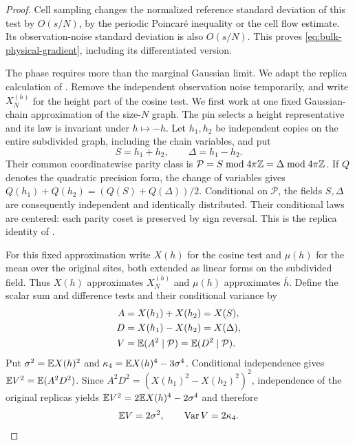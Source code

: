 \begin{proof}
Cell sampling changes the normalized reference standard deviation
of this test by $O(s/N)$, by the periodic Poincar\'e inequality
or the cell flow estimate.  Its observation-noise standard
deviation is also $O(s/N)$.  This proves
\eqref{eq:bulk-physical-gradient}, including its differentiated
version.

The phase requires more than the marginal Gaussian limit.  We
adapt the replica calculation of
\cite[Lemma 10.1]{B}.  Remove the
independent observation noise temporarily, and write $X_N^{(h)}$
for the height part of the cosine test.  We first work at one
fixed Gaussian-chain approximation of the size-$N$ graph.  The
pin selects a height representative and its law is invariant
under $h\mapsto-h$.  Let $h_1,h_2$ be independent copies on
the entire subdivided graph, including the chain variables, and put
\[
 S=h_1+h_2,\qquad \Delta=h_1-h_2.
\]
Their common coordinatewise parity class is
$\mathcal P=S\bmod4\pi\mathbb Z=\Delta\bmod4\pi\mathbb Z$.  If $Q$ denotes
the quadratic precision form, the change of variables gives
$Q(h_1)+Q(h_2)=(Q(S)+Q(\Delta))/2$.  Conditional on
$\mathcal P$, the fields $S,\Delta$ are consequently independent
and identically distributed.  Their conditional laws are centered:
each parity coset is preserved by sign reversal.  This is the
replica identity of \cite[Equation (2.12), in the
proof of Theorem 2.5]{X}.

For this fixed approximation write $X(h)$ for the cosine test and
$\mu(h)$ for the mean over the original sites, both extended as
linear forms on the subdivided field.  Thus $X(h)$ approximates
$X_N^{(h)}$ and $\mu(h)$ approximates $\bar h$.  Define the scalar
sum and difference tests and their conditional variance by
\begin{align*}
 A&=X(h_1)+X(h_2)=X(S),\\
 D&=X(h_1)-X(h_2)=X(\Delta),\\
 V&=\mathbb E(A^2\mid\mathcal P)=\mathbb E(D^2\mid\mathcal P).
\end{align*}
Put $\sigma^2=\mathbb E X(h)^2$ and
$\kappa_4=\mathbb E X(h)^4-3\sigma^4$.  Conditional independence gives
$\mathbb E V^2=\mathbb E(A^2D^2)$.  Since
$A^2D^2=(X(h_1)^2-X(h_2)^2)^2$, independence of the original
replicas yields $\mathbb E V^2=2\mathbb E X(h)^4-2\sigma^4$ and therefore
\begin{equation}\label{eq:bulk-replica-variance}
 \mathbb E V=2\sigma^2,\qquad \operatorname{Var}V=2\kappa_4.
\end{equation}


\end{proof}
